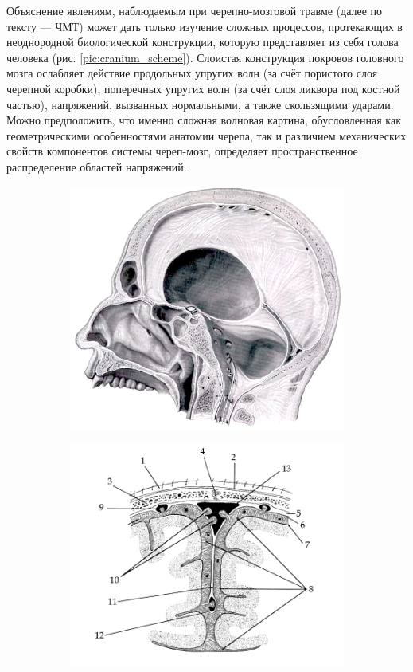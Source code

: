 Объяснение явлениям, наблюдаемым при черепно-мозговой травме (далее по тексту — ЧМТ) может дать только изучение сложных процессов, протекающих в неоднородной биологической конструкции, которую представляет из себя голова человека (рис. \ref{pic:cranium_scheme}). Слоистая конструкция покровов головного мозга ослабляет действие продольных упругих волн (за счёт пористого слоя черепной коробки), поперечных упругих волн (за счёт слоя ликвора под костной частью), напряжений, вызванных нормальными, а также скользящими ударами. Можно предположить, что именно сложная волновая картина, обусловленная как геометрическими особенностями анатомии черепа, так и различием механических свойств компонентов системы череп-мозг, определяет пространственное распределение областей напряжений.

\begin{figure}[htp]
\centering
\begin{subfigure}[b]{0.6\textwidth}
\centering
\includegraphics[width=\textwidth]{png/cranium/real-scheme-01.png}
\end{subfigure}
\begin{subfigure}[b]{0.6\textwidth}
\centering
\includegraphics[width=\textwidth]{png/cranium/real-scheme-02.png}

\end{subfigure}
\end{figure}
